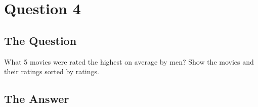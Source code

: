 \section{Question 4}

\subsection{The Question}

\begin{flushleft}

What 5 movies were rated the highest on average by men? Show
the movies and their ratings sorted by ratings.

\end{flushleft}
\subsection{The Answer}


